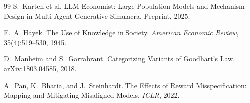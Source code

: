 \documentclass[10pt,letterpaper]{article}
\begin{document}
\begin{thebibliography}{99}
S.~Karten et al.
\newblock LLM Economist: Large Population Models and Mechanism Design in Multi-Agent Generative Simulacra.
\newblock Preprint, 2025.

F.~A. Hayek.
\newblock The Use of Knowledge in Society.
\newblock \emph{American Economic Review}, 35(4):519--530, 1945.

D.~Manheim and S.~Garrabrant.
\newblock Categorizing Variants of Goodhart's Law.
\newblock arXiv:1803.04585, 2018.

A.~Pan, K.~Bhatia, and J.~Steinhardt.
\newblock The Effects of Reward Misspecification: Mapping and Mitigating Misaligned Models.
\newblock \emph{ICLR}, 2022.

\end{thebibliography}
\end{document}
